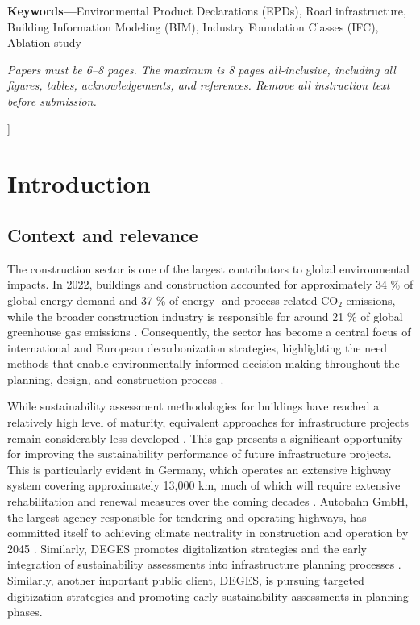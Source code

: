 \documentclass[10pt, a4paper, twocolumn]{article}
\begin{document}
{\begin{@twocolumnfalse}
  \vspace{6pt}

  \noindent\textbf{Keywords---}Environmental Product Declarations (EPDs), Road infrastructure, Building Information Modeling (BIM), Industry Foundation Classes (IFC), Ablation study

  \vspace{8pt}

  {\small\itshape
    Papers must be 6--8 pages. The maximum is 8 pages all-inclusive, including
    all figures, tables, acknowledgements, and references. Remove all instruction
    text before submission.
  \par}

  \vspace{10pt}

\end{@twocolumnfalse}
}]

\section{Introduction}

\subsection{Context and relevance}

The construction sector is one of the largest  contributors to global environmental impacts. In 2022, buildings and construction accounted for approximately 34 \% of global energy demand and 37 \% of energy- and process-related CO$_2$ emissions, while the broader construction industry is responsible for around 21 \% of global greenhouse gas emissions \cite{UN report}. Consequently, the sector has become a central focus of international and European decarbonization strategies, highlighting the need methods that enable environmentally informed decision-making throughout the planning, design,  and construction process \cite{Chen 2024}.

While sustainability assessment methodologies for buildings have reached a relatively high level of maturity, equivalent approaches for infrastructure projects remain considerably less developed \cite{Milic 2024}. This gap presents a significant opportunity for improving the sustainability performance of future infrastructure projects. This is particularly evident in Germany, which operates an extensive highway system covering approximately 13,000 km, much of which will require extensive rehabilitation and renewal measures over the coming decades \cite{FederalMinistryofTransport.2025}. Autobahn GmbH, the largest agency responsible for tendering and operating highways, has committed itself to achieving climate neutrality in construction and operation by 2045 \cite{AutobahnGmbH.}. Similarly, DEGES promotes digitalization strategies and the early integration of sustainability assessments into infrastructure planning processes \cite{DEGES.2025}. Similarly, another important public client, DEGES, is pursuing targeted digitization strategies and promoting early sustainability assessments in planning phases. ~\cite{DEGES.2025} 
\end{document}
